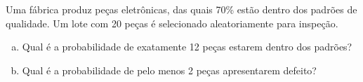 %
%


\begin{exercicioBanco}[\valorquestao]
Uma fábrica produz peças eletrônicas, das quais 70\% estão dentro dos padrões de qualidade. Um lote com 20 peças é selecionado aleatoriamente para inspeção.
%
\begin{enumerate}[(a)]
    \item Qual é a probabilidade de exatamente 12 peças estarem dentro dos padrões?
    \item Qual é a probabilidade de pelo menos 2 peças apresentarem defeito?
\end{enumerate}
%
\end{exercicioBanco}


